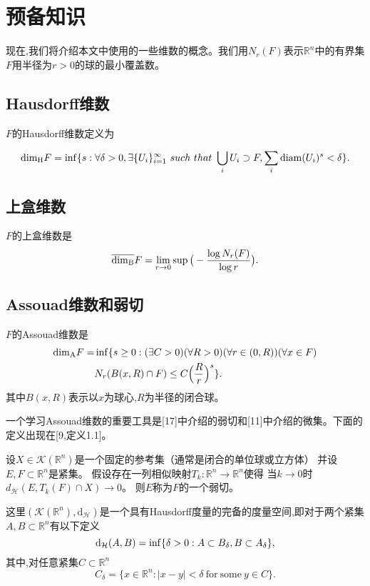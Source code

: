 \section{预备知识}
现在,我们将介绍本文中使用的一些维数的概念。我们用$N_r(F)$表示$\mathbb{R}^n$中的有界集$F$用半径为$r>0$的球的最小覆盖数。

\subsection{Hausdorff维数}
$F$的Hausdorff维数定义为

$$
\mathrm{\dim_H} F=\inf\{s:\forall\delta>0,\exists\{U_i\}_{i=1}^\infty ~such~that~ \bigcup_iU_i\supset F, \sum_i \mathrm{diam}(U_i)^s<\delta\}.
$$

\subsection{上盒维数}
$F$的上盒维数是
$$
\overline{\mathrm{\dim_B}}F= \lim\limits_{r\rightarrow0} \sup\big(-\frac{\log N_r(F)}{\log r}\big).
$$
\subsection{Assouad维数和弱切}
$F$的Assouad维数是
$$
\begin{aligned}
      \mathrm{\dim_A} F=&\inf\{s\ge0:(\exists C>0)(\forall R>0)(\forall r\in(0,R))(\forall x\in F)\\
      &N_r(B(x,R)\cap F)\le C\Big(\frac{R}{r}\Big)^s\}.
\end{aligned}
$$
其中$B(x,R)$表示以$x$为球心,$R$为半径的闭合球。

一个学习Assouad维数的重要工具是[17]中介绍的弱切和[11]中介绍的微集。下面的定义出现在[9,定义1.1]。

\begin{definition}
      设$X\in\mathcal{K}(\mathbb{R}^n)$是一个固定的参考集（通常是闭合的单位球或立方体）
      并设$E,F\subset\mathbb{R}^n$是紧集。
      假设存在一列相似映射$T_k:\mathbb{R}^n\rightarrow\mathbb{R}^n$使得
      当$k\rightarrow0$时$d_\mathcal{H}(E,T_k(F)\cap X)\rightarrow0$。
      则$E$称为$F$的一个弱切。
\end{definition}

这里$(\mathcal{K}(\mathbb{R}^n),\mathrm{d}_\mathcal{H})$是一个具有Hausdorff度量的完备的度量空间,即对于两个紧集
$A,B\subset\mathbb{R}^n$有以下定义
$$
\mathrm{d}_\mathcal{H}(A,B)=\inf\{\delta>0:A\subset B_\delta,B\subset A_\delta\},
$$
其中,对任意紧集$C\subset\mathbb{R}^n$
$$
C_\delta=\{x\in\mathbb{R}^n:|x-y|<\delta ~\mathrm{for~some}~ y\in C\}.
$$

